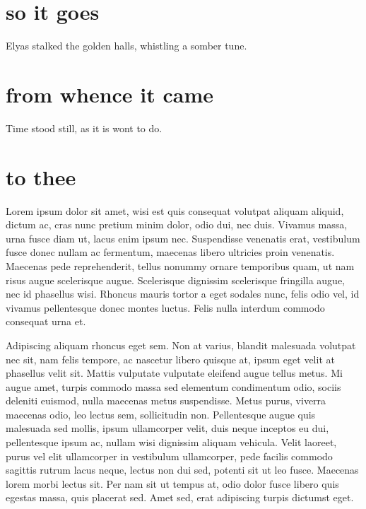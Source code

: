 \documentclass[oneside,11pt]{memoir} %
\begin{document}
\chapter{so it goes}

Elyas stalked the golden halls, whistling a somber tune. 


\chapter{from whence it came}

Time stood still, as it is wont to do.


\chapter{to thee}

Lorem ipsum dolor sit amet, wisi est quis consequat volutpat aliquam aliquid, dictum ac, cras nunc pretium minim dolor, odio dui, nec duis. Vivamus massa, urna fusce diam ut, lacus enim ipsum nec. Suspendisse venenatis erat, vestibulum fusce donec nullam ac fermentum, maecenas libero ultricies proin venenatis. Maecenas pede reprehenderit, tellus nonummy ornare temporibus quam, ut nam risus augue scelerisque augue. Scelerisque dignissim scelerisque fringilla augue, nec id phasellus wisi. Rhoncus mauris tortor a eget sodales nunc, felis odio vel, id vivamus pellentesque donec montes luctus. Felis nulla interdum commodo consequat urna et.

Adipiscing aliquam rhoncus eget sem. Non at varius, blandit malesuada volutpat nec sit, nam felis tempore, ac nascetur libero quisque at, ipsum eget velit at phasellus velit sit. Mattis vulputate vulputate eleifend augue tellus metus. Mi augue amet, turpis commodo massa sed elementum condimentum odio, sociis deleniti euismod, nulla maecenas metus suspendisse. Metus purus, viverra maecenas odio, leo lectus sem, sollicitudin non. Pellentesque augue quis malesuada sed mollis, ipsum ullamcorper velit, duis neque inceptos eu dui, pellentesque ipsum ac, nullam wisi dignissim aliquam vehicula. Velit laoreet, purus vel elit ullamcorper in vestibulum ullamcorper, pede facilis commodo sagittis rutrum lacus neque, lectus non dui sed, potenti sit ut leo fusce. Maecenas lorem morbi lectus sit. Per nam sit ut tempus at, odio dolor fusce libero quis egestas massa, quis placerat sed. Amet sed, erat adipiscing turpis dictumst eget.
\end{document}
